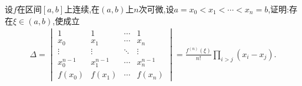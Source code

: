 \documentclass[lang=cn,newtx,10pt,scheme=chinese]{elegantbook}
\begin{document}
\begin{exercise}
    设\(f\)在区间\([a, b]\)上连续,在\((a, b)\)上\(n\)次可微,设\(a = x_0 < x_1 < \cdots < x_n = b\),证明:存在\(\xi \in (a, b)\),使成立
    \begin{align}
    \Delta = 
    \begin{vmatrix}
    1 & 1 & \cdots & 1 \\
    x_0 & x_1 & \cdots & x_n \\
    \vdots & \vdots & \ddots & \vdots \\
    x_0^{n-1} & x_1^{n-1} & \cdots & x_n^{n-1} \\
    f(x_0) & f(x_1) & \cdots & f(x_n)
    \end{vmatrix}
    = \frac{f^{(n)}(\xi)}{n!} \prod_{i > j} (x_i - x_j).
    \nonumber
    \end{align}
\end{exercise}
\end{document}
